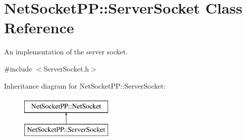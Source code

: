 \hypertarget{class_net_socket_p_p_1_1_server_socket}{\section{Net\-Socket\-P\-P\-:\-:Server\-Socket Class Reference}
\label{class_net_socket_p_p_1_1_server_socket}
}


An implementation of the server socket.  




{\ttfamily \#include $<$Server\-Socket.\-h$>$}

Inheritance diagram for Net\-Socket\-P\-P\-:\-:Server\-Socket\-:\begin{figure}[H]
\begin{center}
\leavevmode
\includegraphics[height=2.000000cm]{class_net_socket_p_p_1_1_server_socket}
\end{center}
\end{figure}
